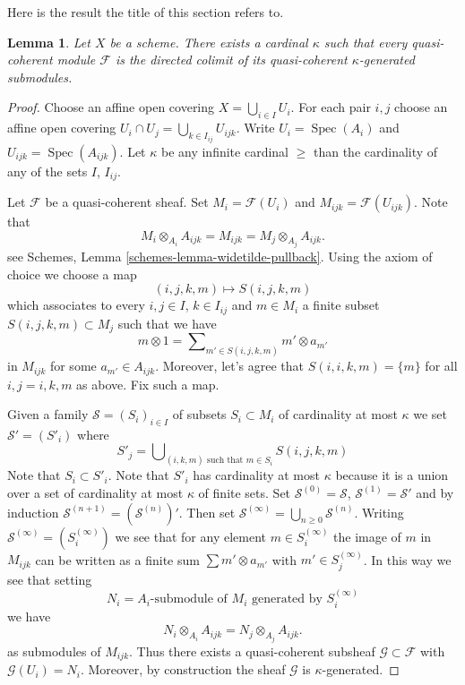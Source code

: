 \documentclass{stacks-project}
\theoremstyle{plain}
\newtheorem{lemma}[subsection]{Lemma}
\theoremstyle{definition}
\theoremstyle{remark}
\numberwithin{equation}{subsection}
\def\Spec{\mathop{\mathrm{Spec}}}
\begin{document}
\noindent
Here is the result the title of this section refers to.

\begin{lemma}
\label{lemma-colimit-kappa}
Let $X$ be a scheme. There exists a cardinal $\kappa$ such that
every quasi-coherent module $\mathcal{F}$ is the directed colimit
of its quasi-coherent $\kappa$-generated submodules.
\end{lemma}

\begin{proof}
Choose an affine open covering $X = \bigcup_{i \in I} U_i$. For each pair
$i, j$ choose an affine open covering
$U_i \cap U_j = \bigcup_{k \in I_{ij}} U_{ijk}$.
Write $U_i = \Spec(A_i)$ and $U_{ijk} = \Spec(A_{ijk})$.
Let $\kappa$ be any infinite cardinal $\geq$ than the cardinality
of any of the sets $I$, $I_{ij}$.

\medskip\noindent
Let $\mathcal{F}$ be a quasi-coherent sheaf. Set $M_i = \mathcal{F}(U_i)$
and $M_{ijk} = \mathcal{F}(U_{ijk})$. Note that
$$
M_i \otimes_{A_i} A_{ijk} = M_{ijk} = M_j \otimes_{A_j} A_{ijk}.
$$
see
Schemes, Lemma \ref{schemes-lemma-widetilde-pullback}.
Using the axiom of choice we choose a map
$$
(i, j, k, m) \mapsto S(i, j, k, m)
$$
which associates to every $i, j \in I$, $k \in I_{ij}$ and $m \in M_i$
a finite subset $S(i, j, k, m) \subset M_j$ such that we have
$$
m \otimes 1 = \sum\nolimits_{m' \in S(i, j, k, m)} m' \otimes a_{m'}
$$
in $M_{ijk}$ for some $a_{m'} \in A_{ijk}$. Moreover, let's agree
that $S(i, i, k, m) = \{m\}$ for all $i, j = i, k, m$ as above.
Fix such a map.

\medskip\noindent
Given a family $\mathcal{S} = (S_i)_{i \in I}$ of subsets
$S_i \subset M_i$ of cardinality at most $\kappa$ we set
$\mathcal{S}' = (S'_i)$ where
$$
S'_j = \bigcup\nolimits_{(i, k, m)\text{ such that }m \in S_i}
S(i, j, k, m)
$$
Note that $S_i \subset S'_i$. Note that $S'_i$ has cardinality at most
$\kappa$ because it is a union over a set of cardinality at most $\kappa$
of finite sets. Set $\mathcal{S}^{(0)} = \mathcal{S}$,
$\mathcal{S}^{(1)} = \mathcal{S}'$ and by induction
$\mathcal{S}^{(n + 1)} = (\mathcal{S}^{(n)})'$. Then set
$\mathcal{S}^{(\infty)} = \bigcup_{n \geq 0} \mathcal{S}^{(n)}$.
Writing $\mathcal{S}^{(\infty)} = (S^{(\infty)}_i)$ we see that
for any element $m \in S^{(\infty)}_i$ the image of $m$ in
$M_{ijk}$ can be written as a finite sum $\sum m' \otimes a_{m'}$
with $m' \in S_j^{(\infty)}$. In this way we see that setting
$$
N_i = A_i\text{-submodule of }M_i\text{ generated by }S^{(\infty)}_i
$$
we have
$$
N_i \otimes_{A_i} A_{ijk} = N_j \otimes_{A_j} A_{ijk}.
$$
as submodules of $M_{ijk}$. Thus there exists a quasi-coherent subsheaf
$\mathcal{G} \subset \mathcal{F}$ with $\mathcal{G}(U_i) = N_i$.
Moreover, by construction the sheaf $\mathcal{G}$ is $\kappa$-generated.


\end{proof}
\end{document}
